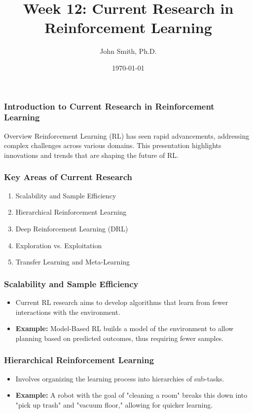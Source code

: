 \documentclass[aspectratio=169]{beamer}
\title[Current Research in RL]{Week 12: Current Research in Reinforcement Learning}
\author[J. Smith]{John Smith, Ph.D.}
\institute[University Name]{
  Department of Computer Science\\
  University Name\\
  \vspace{0.3cm}
  Email: email@university.edu\\
  Website: www.university.edu
}
\date{\today}
\begin{document}
\frame{\titlepage}

\begin{frame}[fragile]
    \frametitle{Introduction to Current Research in Reinforcement Learning}
    \begin{block}{Overview}
        Reinforcement Learning (RL) has seen rapid advancements, addressing complex challenges across various domains. This presentation highlights innovations and trends that are shaping the future of RL.
    \end{block}
\end{frame}

\begin{frame}[fragile]
    \frametitle{Key Areas of Current Research}
    \begin{enumerate}
        \item Scalability and Sample Efficiency
        \item Hierarchical Reinforcement Learning
        \item Deep Reinforcement Learning (DRL)
        \item Exploration vs. Exploitation
        \item Transfer Learning and Meta-Learning
    \end{enumerate}
\end{frame}

\begin{frame}[fragile]
    \frametitle{Scalability and Sample Efficiency}
    \begin{itemize}
        \item Current RL research aims to develop algorithms that learn from fewer interactions with the environment.
        \item \textbf{Example:} Model-Based RL builds a model of the environment to allow planning based on predicted outcomes, thus requiring fewer samples.
    \end{itemize}
\end{frame}

\begin{frame}[fragile]
    \frametitle{Hierarchical Reinforcement Learning}
    \begin{itemize}
        \item Involves organizing the learning process into hierarchies of sub-tasks.
        \item \textbf{Example:} A robot with the goal of "cleaning a room" breaks this down into "pick up trash" and "vacuum floor," allowing for quicker learning.
    \end{itemize}
\end{frame}
\end{document}
